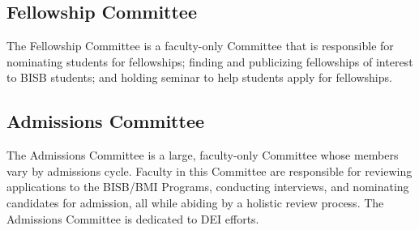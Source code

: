 \subsection{Fellowship Committee}
The Fellowship Committee is a faculty-only Committee that is responsible for nominating students for fellowships; finding and publicizing fellowships of interest to BISB students; and holding seminar to help students apply for fellowships.

\subsection{Admissions Committee}
The Admissions Committee is a large, faculty-only Committee whose members vary by admissions cycle. Faculty in this Committee are responsible for reviewing applications to the BISB/BMI Programs, conducting interviews, and nominating candidates for admission, all while abiding by a holistic review process. The Admissions Committee is dedicated to DEI efforts.